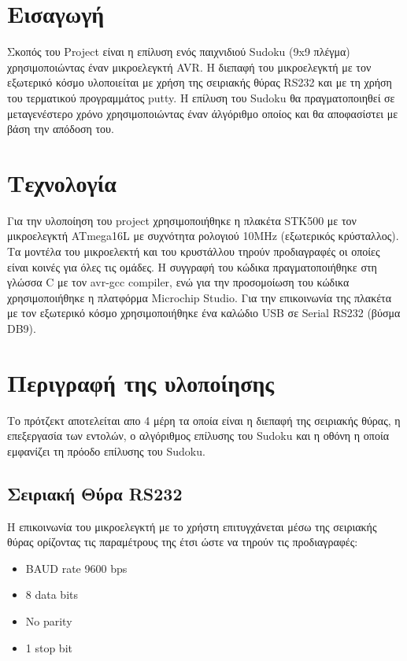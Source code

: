 \documentclass[a4paper,12pt]{article}
\begin{document}
% 


\section{Εισαγωγή}
Σκοπός του Project είναι η επίλυση ενός παιχνιδιού Sudoku (9x9 πλέγμα) χρησιμοποιώντας έναν μικροελεγκτή AVR. Η διεπαφή του μικροελεγκτή με τον εξωτερικό κόσμο υλοποιείται με χρήση της σειριακής θύρας RS232 και με τη χρήση του τερματικού προγραμμάτος putty. Η επίλυση του Sudoku θα πραγματοποιηθεί σε μεταγενέστερο χρόνο χρησιμοποιώντας έναν άλγόριθμο οποίος και θα αποφασίστει με βάση την απόδοση του.

\section{Τεχνολογία}
Για την υλοποίηση του project χρησιμοποιήθηκε η πλακέτα STK500 με τον μικροελεγκτή ATmega16L με συχνότητα ρολογιού 10MHz (εξωτερικός κρύσταλλος). Τα μοντέλα του μικροελεκτή και του κρυστάλλου τηρούν προδιαγραφές οι οποίες είναι κοινές για όλες τις ομάδες. Η συγγραφή του κώδικα πραγματοποιήθηκε στη γλώσσα C με τον avr-gcc compiler, ενώ για την προσομοίωση του κώδικα χρησιμοποιήθηκε η πλατφόρμα Microchip Studio. Για την επικοινωνία της πλακέτα με τον εξωτερικό κόσμο χρησιμοποιήθηκε ένα καλώδιο USB σε Serial RS232 (βύσμα DB9).   


\section{Περιγραφή της υλοποίησης}
Το πρότζεκτ αποτελείται απο 4 μέρη τα οποία είναι η διεπαφή της σειριακής θύρας, η επεξεργασία των εντολών, ο αλγόριθμος επίλυσης του Sudoku και η οθόνη η οποία εμφανίζει τη πρόοδο επίλυσης του Sudoku. 

\subsection{Σειριακή Θύρα RS232}
Η επικοινωνία του μικροελεγκτή με το χρήστη επιτυγχάνεται μέσω της σειριακής θύρας ορίζοντας τις παραμέτρους της έτσι ώστε να τηρούν τις προδιαγραφές:\\
\begin{itemize}
	\item BAUD rate 9600 bps
	\item 8 data bits
	\item No parity
	\item 1 stop bit
\end{itemize}
\end{document}
